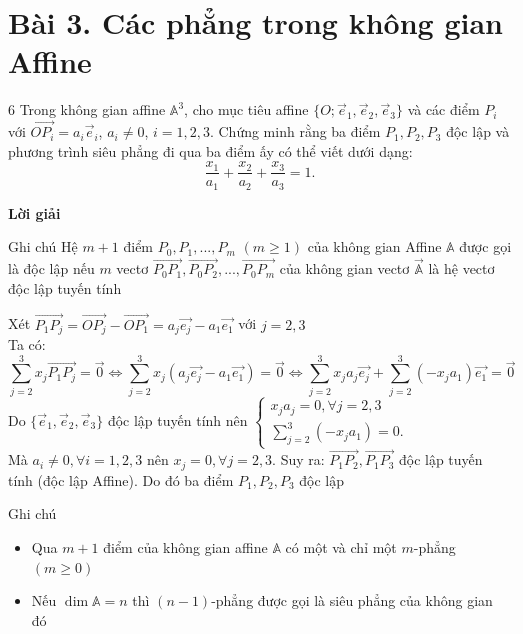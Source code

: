 \documentclass[12pt,a4paper]{article}
\newcommand{\Cau}[2]{
    \vspace{0.8cm} %
    \begin{BaiToanBox}{#1}
        #2
    \end{BaiToanBox}
}
\begin{document}
\section{Bài 3. Các phẳng trong không gian Affine}
\Cau{6}{ Trong không gian affine $\mathbb{A}^3$, cho mục tiêu affine 
$\{O; \vec e_1, \vec e_2, \vec e_3\}$ và các điểm $P_i$ với 
$\overrightarrow{OP_i} = a_i \vec e_i$, $a_i \ne 0$, $i = 1,2,3$. Chứng minh rằng ba điểm $P_1, P_2, P_3$ độc lập và phương trình siêu phẳng 
đi qua ba điểm ấy có thể viết dưới dạng:
\[
\frac{x_1}{a_1} + \frac{x_2}{a_2} + \frac{x_3}{a_3} = 1.
\] }
\begin{center}
{\large\bfseries\textcolor{mainpurple}{Lời giải}}
\end{center}
\setlength{\fboxsep}{6pt}
\begin{DinhNghiaBox}{Ghi chú}
Hệ \(m+1\) điểm \(P_0,P_1,...,P_m\) \((m \ge 1)\) của không gian Affine \(\mathbb{A}\) được gọi là độc lập nếu \(m\) vectơ \( \overrightarrow{P_0P_1},\overrightarrow{P_0P_2},...,\overrightarrow{P_0P_m} \) của không gian vectơ \( \vec{\mathbb{A}} \) là hệ vectơ độc lập tuyến tính 
\end{DinhNghiaBox} 
\noindent Xét \( \overrightarrow{P_1P_j}=\overrightarrow{OP_j}-\overrightarrow{OP_1}=a_j\vec{e_j}-a_1\vec{e_1} \) với \( j= 2,3 \) \\[4pt]
Ta có: \[
\sum_{j=2}^{3} x_j \overrightarrow{P_1P_j} = \vec{0} 
\Leftrightarrow \sum_{j=2}^{3} x_j \left ( a_j\vec{e_j}-a_1\vec{e_1} \right ) = \vec{0}
\Leftrightarrow \sum_{j=2}^{3} x_j a_j\vec{e_j}+\sum_{j=2}^{3} (-x_j a_1)\vec{e_1}=\vec{0}
\]
Do $\{\vec e_1, \vec e_2, \vec e_3\}$ độc lập tuyến tính nên \(
\begin{cases}
x_j a_j = 0,  \forall j=2,3 \\[6pt]
\displaystyle \sum_{j=2}^{3} (-x_j a_1) = 0.
\end{cases}
\) \\[4pt]
Mà \( a_i \neq 0, \forall i=1,2,3 \) nên \( x_j=0, \forall j=2,3 \). Suy ra: \( \overrightarrow{P_1P_2},\overrightarrow{P_1P_3} \) độc lập tuyến tính (độc lập Affine). Do đó ba điểm \(P_1,P_2,P_3\) độc lập
\begin{DinhNghiaBox}{Ghi chú}
\begin{itemize}
    \item Qua \(m+1\) điểm của không gian affine \(\mathbb{A}\) có một và chỉ một \(m\)-phẳng \((m \ge 0)\)
    \item Nếu \( \dim \mathbb{A}=n\) thì \((n-1)\)-phẳng được gọi là siêu phẳng của không gian đó
\end{itemize}
\end{DinhNghiaBox}
\end{document}
